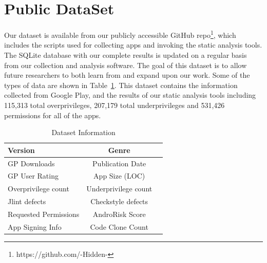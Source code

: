 \documentclass{sig-alternate}
\newif\ifisnopii
\begin{document}


\section{Public DataSet}
\label{sec:dataset}

Our dataset is available from our publicly accessible GitHub repo\footnote{\ifisnopii https://github.com/DroidDarwin \else https://github.com/-Hidden- \fi}, which includes the scripts used for collecting apps and invoking the static analysis tools. The SQLite database with our complete results is updated on a regular basis from our collection and analysis software. The goal of this dataset is to allow future researchers to both learn from and expand upon our work. Some of the types of data are shown in Table~\ref{table:datasetInfo}. This dataset contains the information collected from Google Play, and the results of our static analysis tools including 115,313 total overprivileges, 207,179 total underprivileges and 531,426 permissions for all of the apps.



\begin{table}[h]
\centering
\caption{Dataset Information}
\label{table:datasetInfo}
  \begin{tabular}{ | l | c | c |   } \hline


      Version  & Genre  \\ \hline
      GP Downloads  & Publication Date  \\ \hline
      GP User Rating  & App Size (LOC)  \\ \hline
      Overprivilege count  & Underprivilege count  \\ \hline
      Jlint defects  & Checkstyle defects  \\ \hline
      Requested Permissions  & AndroRisk Score  \\ \hline
      App Signing Info  & Code Clone Count  \\ \hline


  \end{tabular}

\end{table}
\end{document}
